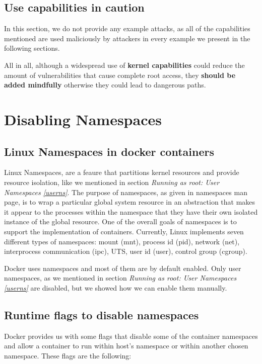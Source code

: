 \subsection{Use capabilities in caution}
In this section, we do not provide any example attacks, as all of the capabilities mentioned are used maliciously by attackers in every example we present in the following sections.

All in all, although a widespread use of \textbf{kernel capabilities} could reduce the amount of vulnerabilities that cause complete root access, they \textbf{should be added mindfully} otherwise they could lead to dangerous paths. 

\section{Disabling Namespaces} \label{disns}
\subsection{Linux Namespaces in docker containers}
Linux Namespaces, are a feaure that partitions kernel resources and provide resource isolation, like we mentioned in section \textit{Running as root: User Namespaces \ref{userns}}.  The purpose of namespaces, as given in namespaces man page, is to wrap a particular global system resource in an abstraction that makes it appear to the processes within the namespace that they have their own isolated instance of the global resource. One of the overall goals of namespaces is to support the implementation of containers. 
Currently, Linux implements seven different types of namespaces: mount (mnt), process id (pid), network (net), interprocess communication (ipc), UTS, user id (user), control group (cgroup).

Docker uses namespaces and most of them are by default enabled. Only user namespaces, as we mentioned in section \textit{Running as root: User Namespaces \ref{userns}} are disabled, but we showed how we can enable them manually.

\subsection{Runtime flags to disable namespaces}
Docker provides us with some flags that disable some of the container namespaces and allow a container to run within host's namespace or within another chosen namespace. These flags are the following:

